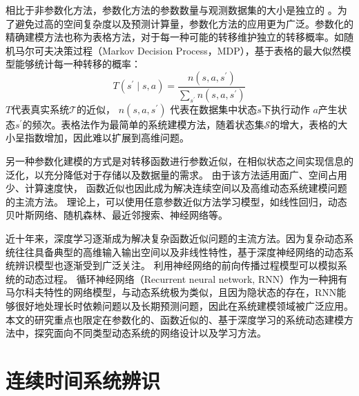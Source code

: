 相比于非参数化方法，参数化方法的参数数量与观测数据集的大小是独立的
。为了避免过高的空间复杂度以及预测计算量，参数化方法的应用更为广泛。参数化的精确建模方法也称为表格方法，对于每一种可能的转移维护独立的转移概率。如随机马尔可夫决策过程（Markov Decision Process，MDP），基于表格的最大似然模型能够统计每一种转移的概率：
\begin{equation}
    T\left(s^{\prime} \mid s, a\right)=\frac{n\left(s, a, s^{\prime}\right)}{\sum_{s^{\prime}} n\left(s, a, s^{\prime}\right)}
\end{equation}
$T$代表真实系统$\mathcal{\mathcal { T }}$的近似，
$n\left(s, a, s^{\prime}\right)$ 代表在数据集中状态$s$下执行动作 $a$产生状态$s^{\prime}$的频次。表格法作为最简单的系统建模方法，随着状态集$\mathcal{S}$的增大，表格的大小呈指数增加，因此难以扩展到高维问题。

另一种参数化建模的方式是对转移函数进行参数近似，在相似状态之间实现信息的泛化，以充分降低对于存储以及数据量的需求。
由于该方法适用面广、空间占用少、计算速度快，
函数近似也因此成为解决连续空间以及高维动态系统建模问题的主流方法。
理论上，可以使用任意参数近似方法学习模型，如线性回归\cite{silver2008sample}，动态贝叶斯网络、随机森林、最近邻搜索、神经网络\cite{werbos1989neural}等。

近十年来，深度学习逐渐成为解决复杂函数近似问题的主流方法。因为复杂动态系统往往具备典型的高维输入输出空间以及非线性特性，基于深度神经网络的动态系统辨识模型也逐渐受到广泛关注。
利用神经网络的前向传播过程模型可以模拟系统的动态过程\cite{temeng1995model, tan1996nonlinear}。
循环神经网络（Recurrent neural network, RNN）作为一种拥有马尔科夫特性的网络模型，与动态系统极为类似，且因为隐状态的存在，RNN能够很好地处理长时依赖问题以及长期预测问题，因此在系统建模领域被广泛应用\cite{delgado1995dynamic, zamarreno1998state}。
本文的研究重点也限定在参数化的、函数近似的、基于深度学习的系统动态建模方法中，探究面向不同类型动态系统的网络设计以及学习方法。



\section{连续时间系统辨识}

